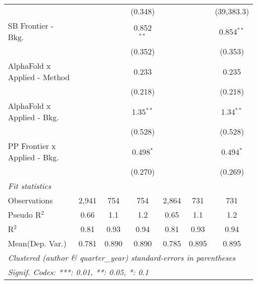 \begin{tabular}{lcccccc}
                                &               &             & (0.348)      &               &             & (39,383.3)\\   
   SB Frontier - Bkg.           &               &             & 0.852$^{**}$ &               &             & 0.854$^{**}$\\   
                                &               &             & (0.352)      &               &             & (0.353)\\   
   AlphaFold x Applied - Method &               &             & 0.233        &               &             & 0.235\\   
                                &               &             & (0.218)      &               &             & (0.218)\\   
   AlphaFold x Applied - Bkg.   &               &             & 1.35$^{**}$  &               &             & 1.34$^{**}$\\   
                                &               &             & (0.528)      &               &             & (0.528)\\   
   PP Frontier x Applied - Bkg. &               &             & 0.498$^{*}$  &               &             & 0.494$^{*}$\\   
                                &               &             & (0.270)      &               &             & (0.269)\\   
   \midrule
   \emph{Fit statistics}\\
   Observations                 & 2,941         & 754         & 754          & 2,864         & 731         & 731\\  
   Pseudo R$^2$                 & 0.66          & 1.1         & 1.2          & 0.65          & 1.1         & 1.2\\  
   R$^2$                        & 0.81          & 0.93        & 0.94         & 0.81          & 0.93        & 0.94\\  
Mean(Dep. Var.) & 0.781 & 0.890 & 0.890 & 0.785 & 0.895 & 0.895 \\
   \midrule \midrule
   \multicolumn{7}{l}{\emph{Clustered (author \& quarter\_year) standard-errors in parentheses}}\\
   \multicolumn{7}{l}{\emph{Signif. Codes: ***: 0.01, **: 0.05, *: 0.1}}\\
\end{tabular}
\par\endgroup
